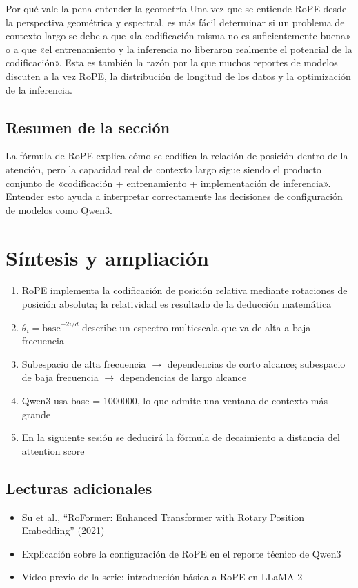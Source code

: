 \documentclass[a4paper]{article}
\begin{document}
\begin{knowledgebox}{Por qué vale la pena entender la geometría}
Una vez que se entiende RoPE desde la perspectiva geométrica y espectral, es más fácil determinar si un problema de contexto largo se debe a que «la codificación misma no es suficientemente buena» o a que «el entrenamiento y la inferencia no liberaron realmente el potencial de la codificación». Esta es también la razón por la que muchos reportes de modelos discuten a la vez RoPE, la distribución de longitud de los datos y la optimización de la inferencia.
\end{knowledgebox}

\subsection{Resumen de la sección}
La fórmula de RoPE explica cómo se codifica la relación de posición dentro de la atención, pero la capacidad real de contexto largo sigue siendo el producto conjunto de «codificación + entrenamiento + implementación de inferencia». Entender esto ayuda a interpretar correctamente las decisiones de configuración de modelos como Qwen3.
\section{Síntesis y ampliación}

\begin{enumerate}
  \item RoPE implementa la codificación de posición relativa mediante rotaciones de posición absoluta; la relatividad es resultado de la deducción matemática
  \item $\theta_i = \text{base}^{-2i/d}$ describe un espectro multiescala que va de alta a baja frecuencia
  \item Subespacio de alta frecuencia $\to$ dependencias de corto alcance; subespacio de baja frecuencia $\to$ dependencias de largo alcance
  \item Qwen3 usa base = 1000000, lo que admite una ventana de contexto más grande
  \item En la siguiente sesión se deducirá la fórmula de decaimiento a distancia del attention score
\end{enumerate}

\subsection{Lecturas adicionales}
\begin{itemize}
  \item Su et al., ``RoFormer: Enhanced Transformer with Rotary Position Embedding'' (2021)
  \item Explicación sobre la configuración de RoPE en el reporte técnico de Qwen3
  \item Video previo de la serie: introducción básica a RoPE en LLaMA 2
\end{itemize}
\end{document}
